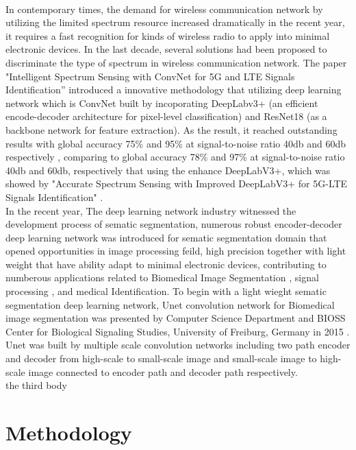 \documentclass[journal]{IEEEtran} %
\begin{document}
%
\\
\indent
In contemporary times, the demand for wireless communication network by utilizing the limited spectrum resource increased dramatically in the recent year, it requires a fast recognition for kinds of wireless radio to apply into minimal electronic devices. In the last decade, several solutions had been proposed to discriminate the type of spectrum in wireless communication network. The paper "Intelligent Spectrum Sensing with ConvNet for 5G and LTE Signals Identification”\cite{b1} introduced a innovative methodology that utilizing deep learning network which is ConvNet built by incoporating DeepLabv3+ (an efficient encode-decoder architecture for pixel-level classification) and ResNet18 (as a backbone network for feature extraction). As the result, it reached outstanding results with global accuracy 75\% and 95\% at signal-to-noise ratio 40db and 60db respectively \cite{b1}, comparing to global accuracy 78\% and 97\% at signal-to-noise ratio 40db and 60db, respectively that using the enhance DeepLabV3+, which was showed by "Accurate Spectrum Sensing with Improved DeepLabV3+ for 5G-LTE Signals Identification" \cite{b2}.
%
\\
\indent
In the recent year, The deep learning network industry witnessed the development process of sematic segmentation, numerous robust encoder-decoder deep learning network was introduced for sematic segmentation domain that opened opportunities in image processing feild, high precision together with light weight that have ability adapt to minimal electronic devices, contributing to numberous applications related to Biomedical
Image Segmentation \cite{b5}, signal processing \cite{b1} \cite{b2}, and medical Identification. To begin with a light wieght sematic segmentation deep learning network, Unet convolution network for Biomedical image segmentation was presented by Computer Science Department and BIOSS Center for Biological Signaling Studies, University of Freiburg, Germany in 2015 \cite{b5}. Unet was built by multiple scale convolution networks including two path encoder and decoder from high-scale to small-scale image and small-scale image to high-scale image connected to encoder path and decoder path respectively.
%
\\
\indent
the third body


\section{Methodology}
\end{document}
